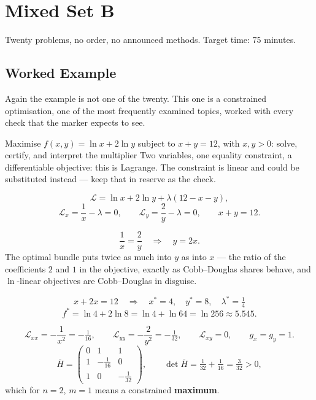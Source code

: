\chapter{Mixed Set B}

Twenty problems, no order, no announced methods. Target time: 75 minutes.

\section{Worked Example}

Again the example is not one of the twenty. This one is a constrained
optimisation, one of the most frequently examined topics, worked
with every check that the marker expects to see.

\begin{worked}{Maximise $f(x,y)=\ln x+2\ln y$ subject to $x+y=12$, with $x,y>0$: solve, certify, and interpret the multiplier}
Two variables, one equality constraint, a differentiable objective: this is
Lagrange. The constraint is linear and could be substituted instead --- keep
that in reserve as the check.

\[
  \mathcal L=\ln x+2\ln y+\lambda(12-x-y),
\]
\[
  \mathcal L_{x}=\frac1x-\lambda=0,
  \qquad
  \mathcal L_{y}=\frac2y-\lambda=0,
  \qquad
  x+y=12 .
\]

\[
  \frac1x=\frac2y
  \quad\Longrightarrow\quad
  y=2x .
\]
The optimal bundle puts twice as much into $y$ as into $x$ --- the ratio of
the coefficients $2$ and $1$ in the objective, exactly as Cobb--Douglas
shares behave, and $\ln$-linear objectives are Cobb--Douglas in disguise.

\[
  x+2x=12
  \quad\Longrightarrow\quad
  \boxed{x^{*}=4,\quad y^{*}=8,\quad \lambda^{*}=\tfrac14 }
\]
\[
  f^{*}=\ln4+2\ln8=\ln4+\ln64=\ln256\approx5.545 .
\]

\[
  \mathcal L_{xx}=-\frac{1}{x^{2}}=-\tfrac{1}{16},
  \qquad
  \mathcal L_{yy}=-\frac{2}{y^{2}}=-\tfrac{1}{32},
  \qquad
  \mathcal L_{xy}=0,
  \qquad
  g_{x}=g_{y}=1 .
\]
\[
  \overline H=\begin{pmatrix}0&1&1\\1&-\tfrac{1}{16}&0\\1&0&-\tfrac{1}{32}\end{pmatrix},
  \qquad
  \det\overline H=\tfrac{1}{32}+\tfrac{1}{16}=\tfrac{3}{32}>0 ,
\]
which for $n=2$, $m=1$ means a constrained \textbf{maximum}. \checkmark


\end{worked}
